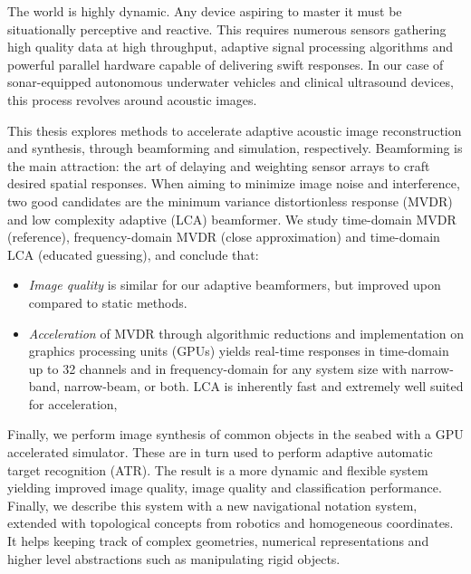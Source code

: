 
The world is highly dynamic. Any device aspiring to master it must be situationally perceptive and reactive. This requires numerous sensors gathering high quality data at high throughput, adaptive signal processing algorithms and powerful parallel hardware capable of delivering swift responses. In our case of sonar-equipped autonomous underwater vehicles and clinical ultrasound devices, this process revolves around acoustic images.

This thesis explores methods to accelerate adaptive acoustic image reconstruction and synthesis, through beamforming and simulation, respectively. Beamforming is the main attraction: the art of delaying and weighting sensor arrays to craft desired spatial responses. When aiming to minimize image noise and interference, two good candidates are the minimum variance distortionless response (MVDR) and low complexity adaptive (LCA) beamformer. We study time-domain MVDR (reference), frequency-domain MVDR (close approximation) and time-domain LCA (educated guessing), and conclude that:
%
\begin{itemize}
\item \emph{Image quality} is similar for our adaptive beamformers, but improved upon compared to static methods.
%
\item \emph{Acceleration} of MVDR through algorithmic reductions and implementation on graphics processing units (GPUs) yields real-time responses in time-domain up to 32 channels and in frequency-domain for any system size with narrow-band, narrow-beam, or both. LCA is inherently fast and extremely well suited for acceleration, 
\end{itemize}
%
Finally, we perform image synthesis of common objects in the seabed with a GPU accelerated simulator. These are in turn used to perform adaptive automatic target recognition (ATR). The result is a more dynamic and flexible system yielding improved image quality, image quality and classification performance. Finally, we describe this system with a new navigational notation system, extended with topological concepts from robotics and homogeneous coordinates. It helps keeping track of complex geometries, numerical representations and higher level abstractions such as manipulating rigid objects.



